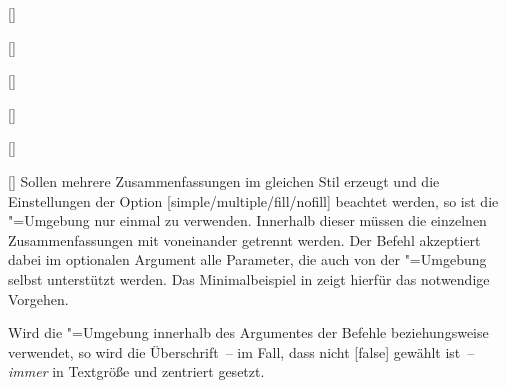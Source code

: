 \documentclass[english,ngerman,ToDo=no]{tudscrman3}
\begin{document}
\begin{Declaration}{[]}
\begin{Declaration}[v2.02]{}
\begin{Declaration}{[]}
\begin{Declaration}[v2.02]{%
  []%
}
\begin{Declaration}[v2.02]{%
  []%
}
\begin{Declaration}{[]}
\begin{Declaration}{[\PSet]}{%
}
Sollen mehrere Zusammenfassungen im gleichen Stil erzeugt und die Einstellungen 
der Option [simple/multiple/fill/nofill] beachtet werden, so 
ist die "=Umgebung nur einmal zu verwenden. Innerhalb 
dieser müssen die einzelnen Zusammenfassungen mit  
voneinander getrennt werden. Der Befehl akzeptiert dabei im optionalen Argument 
alle Parameter, die auch von der "=Umgebung selbst 
unterstützt werden. Das Minimalbeispiel in  
zeigt hierfür das notwendige Vorgehen.

Wird die "=Umgebung innerhalb des Argumentes der Befehle 
 beziehungsweise  verwendet, 
so wird die Überschrift~-- im Fall, dass nicht [false] gewählt 
ist~-- \emph{immer} in Textgröße und zentriert gesetzt.
\end{Declaration}
\end{Declaration}
\end{Declaration}
\end{Declaration}
\end{Declaration}
\end{Declaration}
\end{Declaration}



\Blindtext
{}
\blindtext
{}
\blindtext
{}
%
%

%
%




\end{document}
